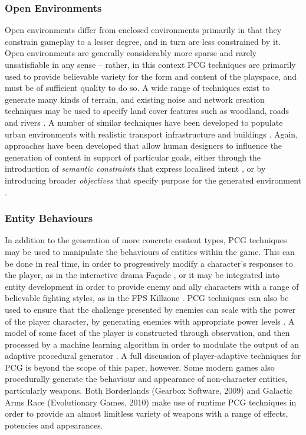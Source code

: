 \documentclass{acm_proc_article-sp}
\begin{document}
\subsubsection{Open Environments}
Open environments differ from enclosed environments primarily in that they constrain gameplay to a lesser degree, and in turn are less constrained by it. Open environments are generally considerably more sparse and rarely unsatisfiable in any sense -- rather, in this context PCG techniques are primarily used to provide believable variety for the form and content of the playspace, and must be of sufficient quality to do so. A wide range of techniques exist to generate many kinds of terrain, and existing noise and network creation techniques may be used to specify land cover features such as woodland, roads and rivers \cite{raffe2012survey,perlin2002improving}. A number of similar techniques have been developed to populate urban environments with realistic transport infrastructure and buildings \cite{carli2011survey}. Again, approaches have been developed that allow human designers to influence the generation of content in support of particular goals, either through the introduction of \textit{semantic constraints} that express localised intent \cite{smelik2011semantic}, or by introducing broader \textit{objectives} that specify purpose for the generated environment \cite{togelius2010towards}.


\subsubsection{Entity Behaviours}
In addition to the generation of more concrete content types, PCG techniques may be used to manipulate the behaviours of entities within the game. This can be done in real time, in order to progressively modify a character's responses to the player, as in the interactive drama Fa{\c{c}}ade \cite{mateas2007writing}, or it may be integrated into entity development in order to provide enemy and ally characters with a range of believable fighting styles, as in the FPS Killzone \cite{straatman2005killzone}.
PCG techniques can also be used to ensure that the challenge presented by enemies can scale with the power of the player character, by generating enemies with appropriate power levels \cite{hamlet}. A model of some facet of the player is constructed through observation, and then processed by a machine learning algorithm in order to modulate the output of an adaptive procedural generator \cite{lopes2011adaptivity}. A full discussion of player-adaptive techniques for PCG is beyond the scope of this paper, however.
Some modern games also procedurally generate the behaviour and appearance of non-character entities, particularly weapons. Both Borderlands (Gearbox Software, 2009) and Galactic Arms Race (Evolutionary Games, 2010) make use of runtime PCG techniques in order to provide an almost limitless variety of weapons with a range of effects, potencies and appearances.
\end{document}
